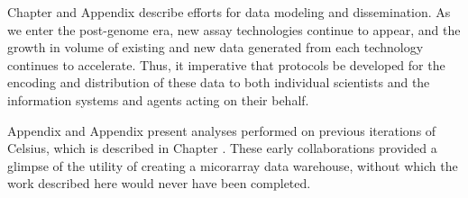 Chapter \gmodwebchapter and Appendix \daschapter describe efforts for data
modeling and dissemination.  As we enter the post-genome era, new assay
technologies continue to appear, and the growth in volume of existing and new
data generated from each technology continues to accelerate.  Thus, it
imperative that protocols be developed for the encoding and distribution of
these data to both individual scientists and the information systems and agents
acting on their behalf.

Appendix \chochapter and Appendix \funarichapter present analyses performed on
previous iterations of Celsius, which is described in Chapter \celsiuschapter.
These early collaborations provided a glimpse of the utility of creating a
micorarray data warehouse, without which the work described here would never
have been completed.
